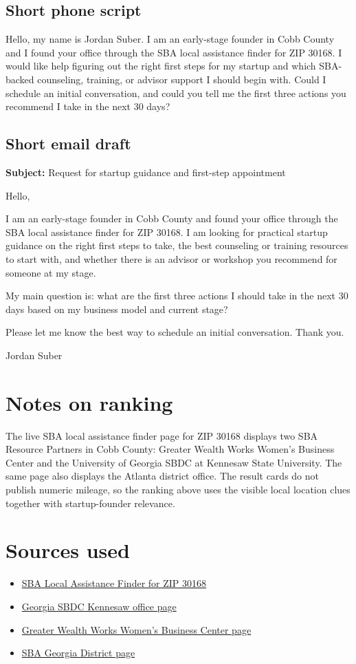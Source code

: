 \documentclass[11pt]{article}
\begin{document}
\subsection*{Short phone script}
Hello, my name is Jordan Suber. I am an early-stage founder in Cobb County and I found your office through the SBA local assistance finder for ZIP 30168. I would like help figuring out the right first steps for my startup and which SBA-backed counseling, training, or advisor support I should begin with. Could I schedule an initial conversation, and could you tell me the first three actions you recommend I take in the next 30 days?

\subsection*{Short email draft}
\textbf{Subject:} Request for startup guidance and first-step appointment

Hello,

I am an early-stage founder in Cobb County and found your office through the SBA local assistance finder for ZIP 30168. I am looking for practical startup guidance on the right first steps to take, the best counseling or training resources to start with, and whether there is an advisor or workshop you recommend for someone at my stage.

My main question is: what are the first three actions I should take in the next 30 days based on my business model and current stage?

Please let me know the best way to schedule an initial conversation. Thank you.

Jordan Suber

\section*{Notes on ranking}
The live SBA local assistance finder page for ZIP 30168 displays two SBA Resource Partners in Cobb County: Greater Wealth Works Women's Business Center and the University of Georgia SBDC at Kennesaw State University. The same page also displays the Atlanta district office. The result cards do not publish numeric mileage, so the ranking above uses the visible local location clues together with startup-founder relevance.

\section*{Sources used}
\begin{itemize}[leftmargin=1.25em]
\item \href{https://www.sba.gov/local-assistance/find?zip=30168&type=All}{SBA Local Assistance Finder for ZIP 30168}
\item \href{https://georgiasbdc.org/locations/kennesaw-office/}{Georgia SBDC Kennesaw office page}
\item \href{https://greaterwealthworks.org/wbc/}{Greater Wealth Works Women's Business Center page}
\item \href{https://www.sba.gov/district/georgia}{SBA Georgia District page}
\end{itemize}
\end{document}
